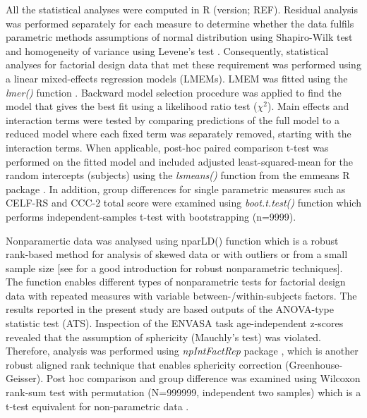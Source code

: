 \documentclass[a4paper, twoside]{templates/ociamthesis}
\begin{document}
All the statistical analyses were computed in R (version; REF). Residual analysis was performed separately for each measure to determine whether the data fulfils parametric methods assumptions of normal distribution using Shapiro-Wilk test \autocite[\emph{shapiro.test()},][]{RCore} and homogeneity of variance using Levene's test \autocite[\emph{leveneTest()};][]{carPackageR}. Consequently, statistical analyses for factorial design data that met these requirement was performed using a linear mixed-effects regression models (LMEMs). LMEM was fitted using the \emph{lmer()} function \autocite[lme4 package;][]{lme4PackageR}. Backward model selection procedure was applied to find the model that gives the best fit using a likelihood ratio test (\(\chi^2\)). Main effects and interaction terms were tested by comparing predictions of the full model to a reduced model where each fixed term was separately removed, starting with the interaction terms. When applicable, post-hoc paired comparison t-test was performed on the fitted model and included adjusted least-squared-mean for the random intercepts (subjects) using the \emph{lsmeans()} function from the emmeans R package \autocite{emmeansPackageR}. In addition, group differences for single parametric measures such as CELF-RS and CCC-2 total score were examined using \emph{boot.t.test()} function \autocite[MKinfer package;][]{MKinferPackageR} which performs independent-samples t-test with bootstrapping (n=9999).

Nonparamertic data was analysed using nparLD() function \autocite[nparLD package;][]{nparLDPackageR} which is a robust rank-based method for analysis of skewed data or with outliers or from a small sample size {[}see \autocite{Feys2016} for a good introduction for robust nonparametric techniques{]}. The function enables different types of nonparametric tests for factorial design data with repeated measures with variable between-/within-subjects factors. The results reported in the present study are based outputs of the ANOVA-type statistic test (ATS). Inspection of the ENVASA task age-independent z-scores revealed that the assumption of sphericity (Mauchly's test) was violated. Therefore, analysis was performed using \emph{npIntFactRep} package \autocite{npIntFactRepPackageR}, which is another robust aligned rank technique that enables sphericity correction (Greenhouse-Geisser). Post hoc comparison and group difference was examined using Wilcoxon rank-sum test with permutation (N=999999, independent two samples) which is a t-test equivalent for non-parametric data \autocite[\emph{coin::wilcox\_test()};][]{CoinPackageR}.
\end{document}
